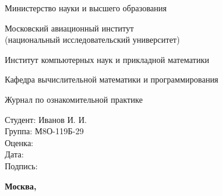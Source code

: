 \documentclass[12pt]{article}
\begin{document}
\begin{titlepage}
\begin{center}
\bfseries

{\Large Министерство науки и высшего образования}

\vspace{12pt}

{\Large Московский авиационный институт \\ (национальный исследовательский университет)}

\vspace{48pt}

\large Институт компьютерных наук и прикладной математики

\vspace{36pt}

\large Кафедра вычислительной математики и программирования

\vspace{72pt}

Журнал по ознакомительной практике \\

\end{center}

\vspace{180pt}

\begin{flushleft}
\hspace{350pt} Студент: Иванов И. И. \\
\hspace{350pt} Группа: М8О-119Б-29 \\
\vspace{5pt}
\hspace{350pt} Оценка: \\
\vspace{5pt}
\hspace{350pt} Дата: \\
\vspace{5pt}
\hspace{350pt} Подпись:
\end{flushleft}

\vspace*{\fill}

\begin{center}
\bfseries
Москва, \the\year
\end{center}
\end{titlepage}

\pagebreak








\pagebreak
\end{document}
